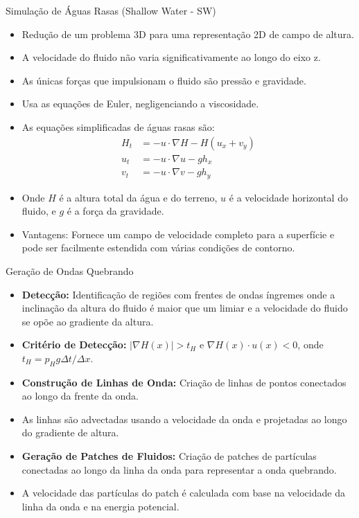 \documentclass[aspectratio=169,xcolor=table]{beamer}
\begin{document}
\begin{frame}{Simulação de Águas Rasas (Shallow Water - SW)}
    \begin{itemize}
        \item Redução de um problema 3D para uma representação 2D de campo de altura.
        \item A velocidade do fluido não varia significativamente ao longo do eixo z.
        \item As únicas forças que impulsionam o fluido são pressão e gravidade.
        \item Usa as equações de Euler, negligenciando a viscosidade.
        \item As equações simplificadas de águas rasas são:
        \begin{align*}
            H_t &= -u \cdot \nabla H - H(u_x + v_y) \\
            u_t &= -u \cdot \nabla u - gh_x \\
            v_t &= -u \cdot \nabla v - gh_y
        \end{align*}
        \item Onde $H$ é a altura total da água e do terreno, $u$ é a velocidade horizontal do fluido, e $g$ é a força da gravidade.
        \item Vantagens: Fornece um campo de velocidade completo para a superfície e pode ser facilmente estendida com várias condições de contorno.
    \end{itemize}
\end{frame}

\begin{frame}{Geração de Ondas Quebrando}
    \begin{itemize}
        \item \textbf{Detecção:} Identificação de regiões com frentes de ondas íngremes onde a inclinação da altura do fluido é maior que um limiar e a velocidade do fluido se opõe ao gradiente da altura.
        \item \textbf{Critério de Detecção:} $|\nabla H(x)| > t_H$ e $\nabla H(x) \cdot u(x) < 0$, onde $t_H = p_H g \Delta t / \Delta x$.
        \item \textbf{Construção de Linhas de Onda:} Criação de linhas de pontos conectados ao longo da frente da onda.
        \item As linhas são advectadas usando a velocidade da onda e projetadas ao longo do gradiente de altura.
        \item \textbf{Geração de Patches de Fluidos:} Criação de patches de partículas conectadas ao longo da linha da onda para representar a onda quebrando.
        \item A velocidade das partículas do patch é calculada com base na velocidade da linha da onda e na energia potencial.
    \end{itemize}
\end{frame}
\end{document}
